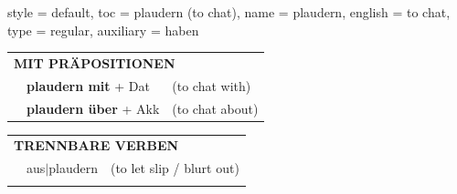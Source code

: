 \begin{verbentry}{
  style = {default},
  toc = {plaudern (to chat)},
  name = {plaudern},
  english = {to chat},
  type = {regular},
  auxiliary = {haben}
}
\vspace{10pt}

\begin{tabular}{lll}
\multicolumn{3}{l}{\textbf{MIT PRÄPOSITIONEN}}\\
& \textbf{plaudern mit} + Dat & (to chat with)\\
& \textbf{plaudern über} + Akk & (to chat about)\\
\end{tabular}
\hfill
\begin{tabular}{lll}
\multicolumn{3}{l}{\textbf{TRENNBARE VERBEN}}\\
& aus$|$plaudern & (to let slip / blurt out)\\
\vspace{10pt}
\end{tabular}

\vspace{-5pt}
\end{verbentry}

